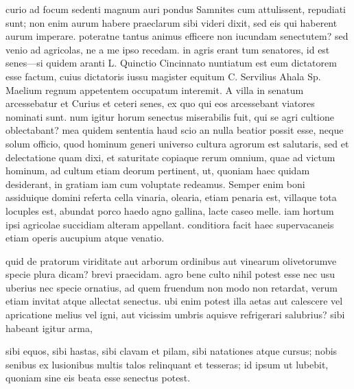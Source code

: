  curio ad focum sedenti magnum auri pondus Samnites cum attulissent, repudiati sunt; non enim aurum habere praeclarum sibi videri dixit, sed eis qui haberent aurum imperare. poteratne tantus animus efficere non iucundam senectutem? sed venio ad agricolas, ne a me ipso recedam. in agris erant tum senatores, id est senes—si quidem aranti L. Quinctio Cincinnato nuntiatum est eum dictatorem esse factum, cuius dictatoris iussu magister equitum C. Servilius Ahala Sp. Maelium regnum appetentem occupatum interemit. A villa in senatum arcessebatur et Curius et ceteri senes, ex quo qui eos arcessebant viatores nominati sunt. num igitur horum senectus miserabilis fuit, qui se agri cultione oblectabant? mea quidem sententia haud scio an nulla beatior possit esse, neque solum officio, quod hominum generi universo cultura agrorum est salutaris, sed et delectatione quam dixi, et saturitate copiaque rerum omnium, quae ad victum hominum, ad cultum etiam deorum pertinent, ut, quoniam haec quidam desiderant, in gratiam iam cum voluptate redeamus. Semper enim boni assiduique domini referta cella vinaria, olearia, etiam penaria est, villaque tota locuples est, abundat porco haedo agno gallina, lacte caseo melle. iam hortum ipsi agricolae succidiam alteram appellant. conditiora facit haec supervacaneis etiam operis aucupium atque venatio.

 quid de pratorum viriditate aut arborum ordinibus aut vinearum olivetorumve specie plura dicam? brevi praecidam. agro bene culto nihil potest esse nec usu uberius nec specie ornatius, ad quem fruendum non modo non retardat, verum etiam invitat atque allectat senectus. ubi enim potest illa aetas aut calescere vel apricatione melius vel igni, aut vicissim umbris aquisve refrigerari salubrius? sibi habeant igitur arma,

 sibi equos, sibi hastas, sibi clavam et pilam, sibi natationes atque cursus; nobis senibus ex lusionibus multis talos relinquant et tesseras; id ipsum ut lubebit, quoniam sine eis beata esse senectus potest.

